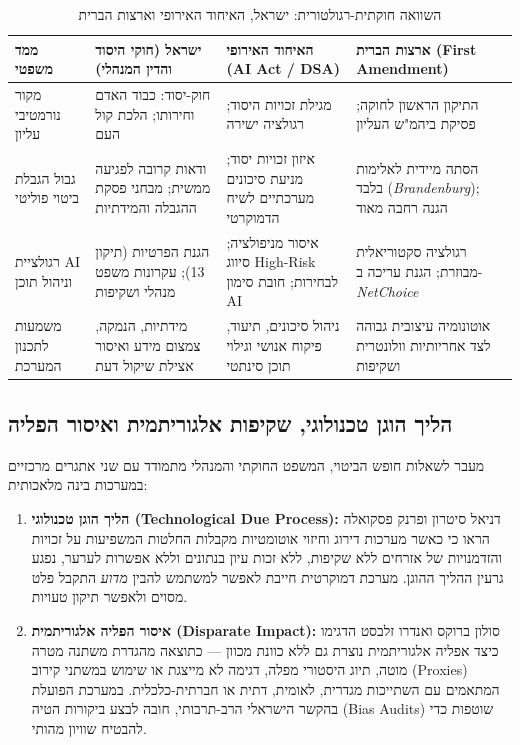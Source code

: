 \begin{table}[htbp]
\centering
\caption{השוואה חוקתית-רגולטורית: ישראל, האיחוד האירופי וארצות הברית}
\label{tab:constitutional-comparison}
\begin{tabular}{|p{2.6cm}|p{3.9cm}|p{4.0cm}|p{4.0cm}|}
\hline
\textbf{ממד משפטי} & \textbf{ישראל (חוקי היסוד והדין המנהלי)} & \textbf{האיחוד האירופי (AI Act / DSA)} & \textbf{ארצות הברית (First Amendment)} \\
\hline
מקור נורמטיבי עליון & חוק-יסוד: כבוד האדם וחירותו; הלכת קול העם \cite{kolhaam1953, mizrahi1995} & מגילת זכויות היסוד; רגולציה ישירה \cite{euaiact2024, eudsa2022} & התיקון הראשון לחוקה; פסיקת ביהמ"ש העליון \cite{brandenburg1969} \\
\hline
גבול הגבלת ביטוי פוליטי & ודאות קרובה לפגיעה ממשית; מבחני פסקת ההגבלה והמידתיות \cite{barak2012proportionality} & איזון זכויות יסוד; מניעת סיכונים מערכתיים לשיח הדמוקרטי & הסתה מיידית לאלימות בלבד (\emph{Brandenburg}); הגנה רחבה מאוד \\
\hline
רגולציית AI וניהול תוכן & הגנת הפרטיות (תיקון 13); עקרונות משפט מנהלי ושקיפות & איסור מניפולציה; סיווג High-Risk לבחירות; חובת סימון AI & רגולציה סקטוריאלית מבוזרת; הגנת עריכה ב-\emph{NetChoice} \cite{netchoice2024} \\
\hline
משמעות לתכנון המערכת & מידתיות, הנמקה, צמצום מידע ואיסור אצילת שיקול דעת & ניהול סיכונים, תיעוד, פיקוח אנושי וגילוי תוכן סינתטי & אוטונומיה עיצובית גבוהה לצד אחריותיות וולונטרית ושקיפות \\
\hline
\end{tabular}
\end{table}

\subsection{הליך הוגן טכנולוגי, שקיפות אלגוריתמית ואיסור הפליה}
מעבר לשאלות חופש הביטוי, המשפט החוקתי והמנהלי מתמודד עם שני אתגרים מרכזיים במערכות בינה מלאכותית:
\begin{enumerate}
    \item \textbf{הליך הוגן טכנולוגי (Technological Due Process):} דניאל סיטרון ופרנק פסקואלה \cite{citron2014scored} הראו כי כאשר מערכות דירוג וחיזוי אוטומטיות מקבלות החלטות המשפיעות על זכויות והזדמנויות של אזרחים ללא שקיפות, ללא זכות עיון בנתונים וללא אפשרות לערער, נפגע גרעין ההליך ההוגן. מערכת דמוקרטית חייבת לאפשר למשתמש להבין \emph{מדוע} התקבל פלט מסוים ולאפשר תיקון טעויות.
    \item \textbf{איסור הפליה אלגוריתמית (Disparate Impact):} סולון ברוקס ואנדרו זלבסט \cite{barocas2016big} הדגימו כיצד אפליה אלגוריתמית נוצרת גם ללא כוונת מכוון --- כתוצאה מהגדרת משתנה מטרה מוטה, תיוג היסטורי מפלה, דגימה לא מייצגת או שימוש במשתני קירוב (Proxies) המתאמים עם השתייכות מגדרית, לאומית, דתית או חברתית-כלכלית. במערכת הפועלת בהקשר הישראלי הרב-תרבותי, חובה לבצע ביקורות הטיה (Bias Audits) שוטפות כדי להבטיח שוויון מהותי.
\end{enumerate}

